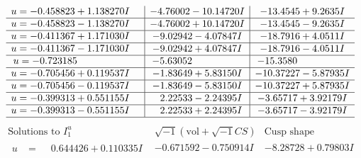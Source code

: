 \documentclass[1p]{elsarticle_modified}
\theoremstyle{definition}
\newcommand{\I}{\sqrt{-1}}
\begin{document}
$$\begin{array}{c|c|c}
\begin{aligned}
u &= -0.458823 + 1.138270 I\end{aligned}
 & -4.76002 - 10.14720 I & -13.4545 + 9.2635 I \\ \hline\begin{aligned}
u &= -0.458823 - 1.138270 I\end{aligned}
 & -4.76002 + 10.14720 I & -13.4545 - 9.2635 I \\ \hline\begin{aligned}
u &= -0.411367 + 1.171030 I\end{aligned}
 & -9.02942 - 4.07847 I & -18.7916 + 4.0511 I \\ \hline\begin{aligned}
u &= -0.411367 - 1.171030 I\end{aligned}
 & -9.02942 + 4.07847 I & -18.7916 - 4.0511 I \\ \hline\begin{aligned}
u &= -0.723185\phantom{ +0.000000I}\end{aligned}
 & -5.63052\phantom{ +0.000000I} & -15.3580\phantom{ +0.000000I} \\ \hline\begin{aligned}
u &= -0.705456 + 0.119537 I\end{aligned}
 & -1.83649 + 5.83150 I & -10.37227 - 5.87935 I \\ \hline\begin{aligned}
u &= -0.705456 - 0.119537 I\end{aligned}
 & -1.83649 - 5.83150 I & -10.37227 + 5.87935 I \\ \hline\begin{aligned}
u &= -0.399313 + 0.551155 I\end{aligned}
 & \phantom{-}2.22533 - 2.24395 I & -3.65717 + 3.92179 I \\ \hline\begin{aligned}
u &= -0.399313 - 0.551155 I\end{aligned}
 & \phantom{-}2.22533 + 2.24395 I & -3.65717 - 3.92179 I\\
 \hline 
 \end{array}$$\newpage$$\begin{array}{c|c|c}  
\text{Solutions to }I^u_{1}& \I (\text{vol} + \sqrt{-1}CS) & \text{Cusp shape}\\
 \hline 
\begin{aligned}
u &= \phantom{-}0.644426 + 0.110335 I\end{aligned}
 & -0.671592 - 0.750914 I & -8.28728 + 0.79803 I \\ \hline\begin{aligned}

\end{aligned}
\end{array}$$
\end{document}
